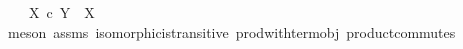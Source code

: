\begin{isabellebody}
\ \ \ \ {\isachardoublequoteopen}X\ {\isasymtimes}\isactrlsub c\ Y\ {\isasymcong}\ X{\isachardoublequoteclose}\isanewline
%
\isadelimproof
\ \ %
\endisadelimproof
%
\isatagproof
{}\isamarkupfalse%
\ {\isacharparenleft}{\kern0pt}meson\ assms\ isomorphic{\isacharunderscore}{\kern0pt}is{\isacharunderscore}{\kern0pt}transitive\ prod{\isacharunderscore}{\kern0pt}with{\isacharunderscore}{\kern0pt}term{\isacharunderscore}{\kern0pt}obj{}\ product{\isacharunderscore}{\kern0pt}commutes{\isacharparenright}{\kern0pt}%
\endisatagproof
{\isafoldproof}%
%
\isadelimproof
\isanewline
%
\endisadelimproof
%
\isadelimtheory
\isanewline
%
\endisadelimtheory
%
\isatagtheory
{}\isamarkupfalse%
%
\endisatagtheory
{\isafoldtheory}%
%
\isadelimtheory
%
\endisadelimtheory
%
\end{isabellebody}%
\endinput
